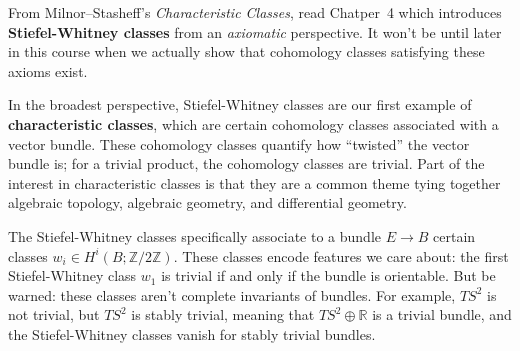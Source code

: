 \documentclass{homework}
\author{Jim Fowler}
\date{Week 3: Stiefel-Whitney classes}
\begin{document}
\maketitle

From Milnor--Stasheff's \textit{Characteristic Classes}, read
Chatper~4 which introduces \textbf{Stiefel-Whitney classes} from an
\textit{axiomatic} perspective.  It won't be until later in this
course when we actually show that cohomology classes satisfying these
axioms exist.

In the broadest perspective, Stiefel-Whitney classes are our first
example of \textbf{characteristic classes}, which are certain
cohomology classes associated with a vector bundle. These cohomology
classes quantify how ``twisted'' the vector bundle is; for a trivial
product, the cohomology classes are trivial. Part of the interest in
characteristic classes is that they are a common theme tying together
algebraic topology, algebraic geometry, and differential geometry.

The Stiefel-Whitney classes specifically associate to a bundle
\( E \to B \) certain classes
\( w_i \in H^i(B; \mathbb{Z}/2\mathbb{Z}) \). These classes encode
features we care about: the first Stiefel-Whitney class \( w_1 \) is
trivial if and only if the bundle is orientable. But be warned: these
classes aren't complete invariants of bundles. For example, \( TS^2 \)
is not trivial, but \( TS^2 \) is stably trivial, meaning that
\( TS^2 \oplus \mathbb{R} \) is a trivial bundle, and the
Stiefel-Whitney classes vanish for stably trivial bundles.
\end{document}
